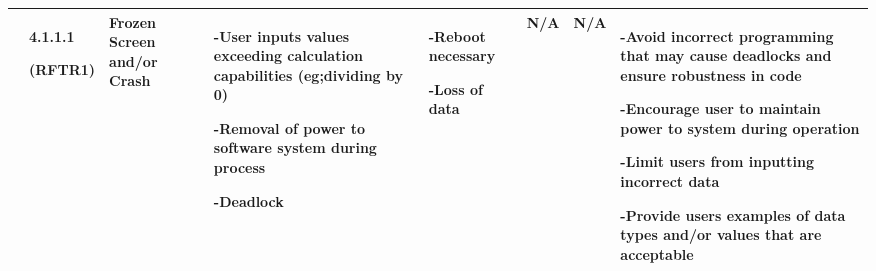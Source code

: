 \documentclass[12pt, titlepage]{article}
\begin{document}
\begin{center}
\begin{adjustwidth}{-3.5cm}{}
\begin{tabular}{|p{1.5cm}|p{1.4cm}|p{1.5cm}|p{2cm}|p{3.5cm}|p{2cm}|p{1.4cm}|p{4.3cm}|}
 & 4.1.1.1 \par(RFTR1) & Frozen Screen and/or Crash & -User inputs values exceeding calculation capabilities (eg;dividing by 0) \par -Removal of power to software system during process \par -Deadlock & -Reboot necessary \par -Loss of data & N/A & N/A & -Avoid incorrect programming that may cause deadlocks and ensure robustness in code \par -Encourage user to maintain power to system during operation \par -Limit users from inputting incorrect data \par -Provide users examples of data types and/or values that are acceptable\\
 \hline
\end{tabular}
\end{adjustwidth}
\end{center}
\end{document}
